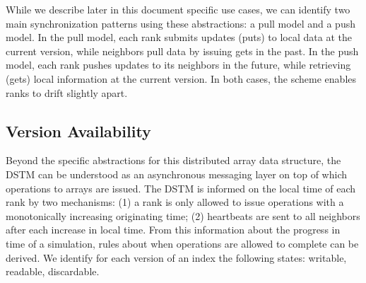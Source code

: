 
While we describe later in this document specific use cases, we can identify two
main synchronization patterns using these abstractions: a pull model and a push
model. In the pull model, each rank submits updates (puts) to local data at the
current version, while neighbors pull data by issuing gets in the past. In the
push model, each rank pushes updates to its neighbors in the future, while
retrieving (gets) local information at the current version. In both
cases, the scheme enables ranks to drift slightly apart.


\subsection{Version Availability}

Beyond the specific abstractions for this distributed array data structure, the
DSTM can be understood as an asynchronous messaging layer on top of which
operations to arrays are issued. The DSTM is informed on the local time of each
rank by two mechanisms: (1) a rank is only allowed to issue operations with a
monotonically increasing originating time; (2) heartbeats are sent to all neighbors
after each increase in local time. From this information about the progress in
time of a simulation, rules about when operations are allowed to complete can be
derived. We identify for each version of an index the following states:
writable, readable, discardable.

